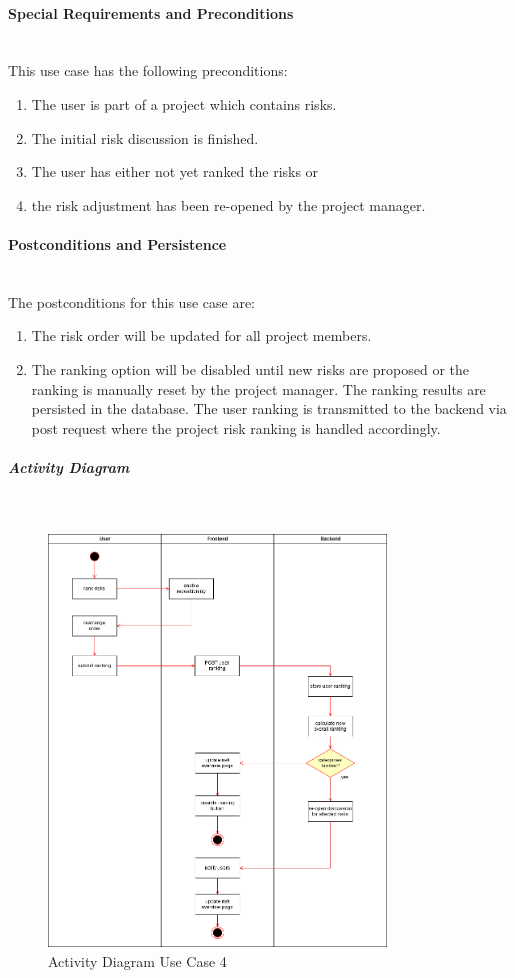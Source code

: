 \paragraph*{Special Requirements and Preconditions}\mbox{}\\
This use case has the following preconditions:
\begin{enumerate}
	\vspace{-3mm}
	\setlength\itemsep{-1em}
	\item The user is part of a project which contains risks.
	\item The initial risk discussion is finished.
	\item The user has either not yet ranked the risks or 
	\item the risk adjustment has been re-opened by the project manager.
\end{enumerate}

\paragraph*{Postconditions and Persistence}\mbox{}\\
The postconditions for this use case are:
\begin{enumerate}
	\vspace{-3mm}
	\setlength\itemsep{-1em}
	\item The risk order will be updated for all project members.
	\item The ranking option will be disabled until new risks are proposed or the ranking is manually reset by the project manager.
	\noindent	
	The ranking results are persisted in the database. The user ranking is transmitted to the backend via post request where the project risk ranking is handled accordingly.
\end{enumerate}

\newpage
\subparagraph{Activity Diagram}\mbox{}\\
\begin{figure}[H]
	\centering
	\includegraphics[width=0.8\textwidth]{Content/Domain/UC4RiskAdjustmentDiagram.png}
	\caption{Activity Diagram Use Case 4}
	\label{fig:label44}
\end{figure}